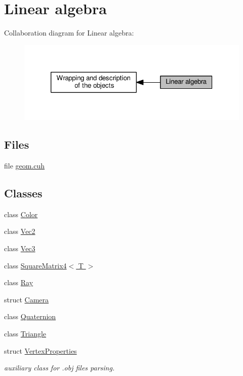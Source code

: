 \hypertarget{group__linear__algebra}{}\section{Linear algebra}
\label{group__linear__algebra}
Collaboration diagram for Linear algebra\+:\nopagebreak
\begin{figure}[H]
\begin{center}
\leavevmode
\includegraphics[width=320pt]{group__linear__algebra}
\end{center}
\end{figure}
\subsection*{Files}
\begin{DoxyCompactItemize}
\item 
file \hyperlink{geom_8cuh}{geom.\+cuh}
\end{DoxyCompactItemize}
\subsection*{Classes}
\begin{DoxyCompactItemize}
\item 
class \hyperlink{class_color}{Color}
\item 
class \hyperlink{class_vec2}{Vec2}
\item 
class \hyperlink{class_vec3}{Vec3}
\item 
class \hyperlink{class_square_matrix4}{Square\+Matrix4$<$ T $>$}
\item 
class \hyperlink{class_ray}{Ray}
\item 
struct \hyperlink{struct_camera}{Camera}
\item 
class \hyperlink{class_quaternion}{Quaternion}
\item 
class \hyperlink{class_triangle}{Triangle}
\item 
struct \hyperlink{struct_vertex_properties}{Vertex\+Properties}
\begin{DoxyCompactList}\small\item\em auxiliary class for .obj files parsing. \end{DoxyCompactList}\end{DoxyCompactItemize}
